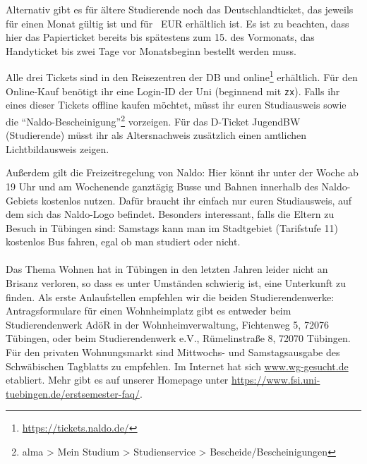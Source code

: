     Alternativ gibt es für ältere Studierende noch das Deutschlandticket, das jeweils für einen Monat gültig ist und für \detickettuepreis~EUR erhältlich ist. 
    Es ist zu beachten, dass hier das Papierticket bereits bis spätestens zum 15. des Vormonats, das Handyticket bis zwei Tage vor Monatsbeginn bestellt werden muss.

    Alle drei Tickets sind in den Reisezentren der DB und online\footnote{\url{https://tickets.naldo.de/}} erhältlich. Für den Online-Kauf benötigt ihr eine Login-ID der Uni (beginnend mit \texttt{zx}). Falls ihr eines dieser Tickets offline kaufen möchtet, müsst ihr euren Studiausweis
    sowie die "`Naldo-Bescheinigung"'\footnote{alma > Mein Studium > Studienservice > Bescheide/Bescheinigungen} vorzeigen. Für das D-Ticket JugendBW (Studierende) müsst ihr als Altersnachweis zusätzlich einen amtlichen Lichtbildausweis zeigen. 
    
    Außerdem gilt die Freizeitregelung von Naldo: Hier könnt ihr unter der Woche ab 19 Uhr und am Wochenende ganztägig Busse und Bahnen innerhalb des Naldo-Gebiets kostenlos nutzen. Dafür braucht ihr einfach nur euren Studiausweis, auf dem sich das Naldo-Logo befindet.
    Besonders interessant, falls die Eltern zu Besuch in Tübingen sind: Samstags kann man im Stadtgebiet (Tarifstufe 11) kostenlos Bus fahren, egal ob man studiert oder nicht. \\\\

    Das Thema Wohnen hat in Tübingen in den letzten Jahren leider nicht an Brisanz verloren, so dass
    es unter Umständen schwierig ist, eine Unterkunft zu finden. Als erste Anlaufstellen empfehlen wir
    die beiden Studierendenwerke: Antragsformulare für einen Wohnheimplatz gibt es entweder beim
    Studierendenwerk AdöR in der Wohnheimverwaltung, Fichtenweg 5, 72076 Tübingen, oder beim Studierendenwerk
    e.V., Rümelinstraße 8, 72070 Tübingen. Für den privaten Wohnungsmarkt sind Mittwochs- und Samstagsausgabe
    des Schwäbischen Tagblatts zu empfehlen.
    Im Internet hat sich \url{www.wg-gesucht.de} etabliert. Mehr gibt es auf unserer Homepage unter \url{https://www.fsi.uni-tuebingen.de/erstsemester-faq/}.
    \fi

